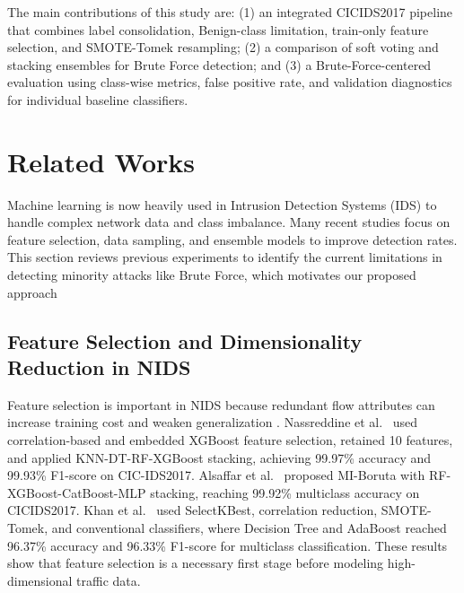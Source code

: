 \documentclass[conference,a4paper]{IEEEtran}
\begin{document}
The main contributions of this study are: (1) an integrated CICIDS2017 pipeline that combines label consolidation, Benign-class limitation, train-only feature selection, and SMOTE-Tomek resampling; (2) a comparison of soft voting and stacking ensembles for Brute Force detection; and (3) a Brute-Force-centered evaluation using class-wise metrics, false positive rate, and validation diagnostics for individual baseline classifiers.

\section{Related Works}

Machine learning is now heavily used in Intrusion Detection Systems (IDS) to handle complex network data and class imbalance. Many recent studies focus on feature selection, data sampling, and ensemble models to improve detection rates. This section reviews previous experiments to identify the current limitations in detecting minority attacks like Brute Force, which motivates our proposed approach

\subsection{Feature Selection and Dimensionality Reduction in NIDS}

Feature selection is important in NIDS because redundant flow attributes can increase training cost and weaken generalization \cite{nassreddine2025ensemble,alsaffar2024shielding,khan2024balanced,selvakumar2025feature,yu2025attack}. Nassreddine et al.\ \cite{nassreddine2025ensemble} used correlation-based and embedded XGBoost feature selection, retained 10 features, and applied KNN-DT-RF-XGBoost stacking, achieving 99.97\% accuracy and 99.93\% F1-score on CIC-IDS2017. Alsaffar et al.\ \cite{alsaffar2024shielding} proposed MI-Boruta with RF-XGBoost-CatBoost-MLP stacking, reaching 99.92\% multiclass accuracy on CICIDS2017. Khan et al.\ \cite{khan2024balanced} used SelectKBest, correlation reduction, SMOTE-Tomek, and conventional classifiers, where Decision Tree and AdaBoost reached 96.37\% accuracy and 96.33\% F1-score for multiclass classification. These results show that feature selection is a necessary first stage before modeling high-dimensional traffic data.
\end{document}
